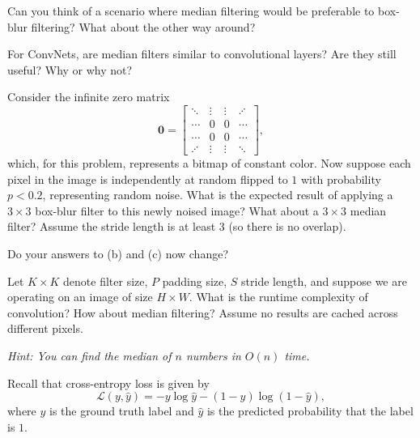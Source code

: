 \documentclass[11pt]{article}
\begin{document}
\begin{subparts}
    Can you think of a scenario where median filtering would be preferable to box-blur filtering? What about the other way around?


    \subpart For ConvNets, are median filters similar to convolutional layers? Are they still useful? Why or why not?


    \subpart Consider the infinite zero matrix 
    $$\mathbf{0} = \begin{bmatrix}
        \ddots & \vdots & \vdots & \iddots \\
        \cdots & 0 & 0 & \cdots \\
        \cdots & 0 & 0 & \cdots \\
        \iddots & \vdots & \vdots & \ddots
    \end{bmatrix},$$ which, for this problem, represents a bitmap of constant color. Now suppose each pixel in the image is independently at random flipped to $1$ with probability $p < 0.2$, representing random noise. What is the expected result of applying a $3 \times 3$ box-blur filter to this newly noised image? What about a $3 \times 3$ median filter? Assume the stride length is at least 3 (so there is no overlap).
    
    Do your answers to (b) and (c) now change?

    \subpart Let $K \times K$ denote filter size, $P$ padding size, $S$ stride length, and suppose we are operating on an image of size $H \times W$. What is the runtime complexity of convolution? How about median filtering? Assume no results are cached across different pixels.

    \emph{Hint: You can find the median of $n$ numbers in $O(n)$ time.}


\end{subparts}

\newpage

	Recall that cross-entropy loss is given by
    $$
    \mathcal{L}(y, \hat{y}) = - y \log \hat{y} - (1 - y) \log (1 - \hat{y}),
    $$
    where $y$ is the ground truth label and $\hat{y}$ is the predicted probability that the label is $1$.
\end{document}
